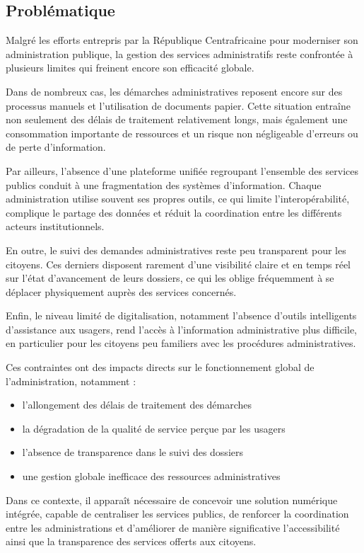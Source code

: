 \subsection{Problématique}

Malgré les efforts entrepris par la République Centrafricaine pour moderniser son administration publique, la gestion des services administratifs reste confrontée à plusieurs limites qui freinent encore son efficacité globale.

Dans de nombreux cas, les démarches administratives reposent encore sur des processus manuels et l’utilisation de documents papier. Cette situation entraîne non seulement des délais de traitement relativement longs, mais également une consommation importante de ressources et un risque non négligeable d’erreurs ou de perte d’information.

Par ailleurs, l’absence d’une plateforme unifiée regroupant l’ensemble des services publics conduit à une fragmentation des systèmes d’information. Chaque administration utilise souvent ses propres outils, ce qui limite l’interopérabilité, complique le partage des données et réduit la coordination entre les différents acteurs institutionnels.

En outre, le suivi des demandes administratives reste peu transparent pour les citoyens. Ces derniers disposent rarement d’une visibilité claire et en temps réel sur l’état d’avancement de leurs dossiers, ce qui les oblige fréquemment à se déplacer physiquement auprès des services concernés.

Enfin, le niveau limité de digitalisation, notamment l’absence d’outils intelligents d’assistance aux usagers, rend l’accès à l’information administrative plus difficile, en particulier pour les citoyens peu familiers avec les procédures administratives.

Ces contraintes ont des impacts directs sur le fonctionnement global de l’administration, notamment :
\begin{itemize}
    \item l’allongement des délais de traitement des démarches
    \item la dégradation de la qualité de service perçue par les usagers
    \item l’absence de transparence dans le suivi des dossiers
     \item une gestion globale inefficace des ressources administratives
\end{itemize}

Dans ce contexte, il apparaît nécessaire de concevoir une solution numérique intégrée, capable de centraliser les services publics, de renforcer la coordination entre les administrations et d’améliorer de manière significative l’accessibilité ainsi que la transparence des services offerts aux citoyens.











